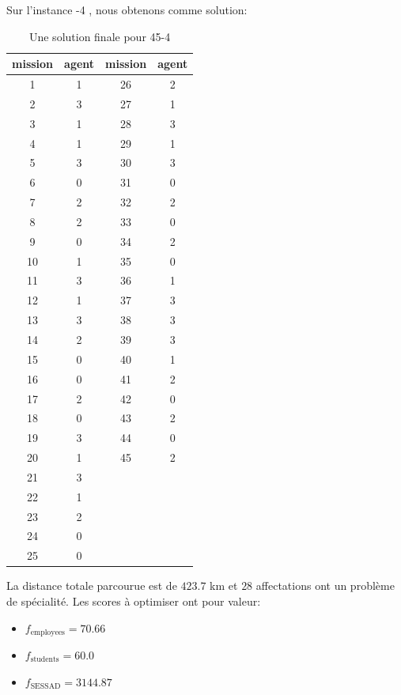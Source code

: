 \documentclass[11pt]{article}
\begin{document}
Sur l'instance -4 \fg, nous obtenons comme solution:

\begin{table}[H]
    \centering
    \begin{tabular}{c|c c|c}
        mission & agent & mission & agent \\
        \hline
        1 & 1 & 26 & 2 \\
        2 & 3 & 27 & 1 \\
        3 & 1 & 28 & 3 \\
        4 & 1 & 29 & 1 \\
        5 & 3 & 30 & 3 \\
        6 & 0 & 31 & 0 \\
        7 & 2 & 32 & 2 \\
        8 & 2 & 33 & 0 \\
        9 & 0 & 34 & 2 \\
        10 & 1 & 35 & 0 \\
        11 & 3 & 36 & 1 \\
        12 & 1 & 37 & 3 \\
        13 & 3 & 38 & 3 \\
        14 & 2 & 39 & 3 \\
        15 & 0 & 40 & 1 \\
        16 & 0 & 41 & 2 \\
        17 & 2 & 42 & 0 \\
        18 & 0 & 43 & 2 \\
        19 & 3 & 44 & 0 \\
        20 & 1 & 45 & 2 \\
        21 & 3 & & \\
        22 & 1 & & \\
        23 & 2 & & \\
        24 & 0 & & \\
        25 & 0 & & \\
    \end{tabular}
    \caption{Une solution finale pour 45-4}
    \label{tab:45-4}
\end{table}

La distance totale parcourue est de $423.7$ km et $28$ affectations ont un problème de spécialité.
Les scores à optimiser ont pour valeur:

\begin{itemize}
    \item $f_{\text{employees}} = 70.66$
    \item $f_{\text{students}} = 60.0$
    \item $f_{\text{SESSAD}} = 3144.87$
\end{itemize}
\end{document}
